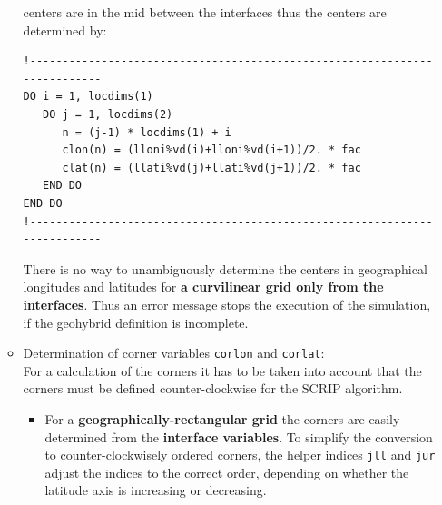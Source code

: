 \documentclass[11pt,twoside]{article}
\begin{document}
\begin{enumerate}
\begin{itemize}
centers are in the mid between the interfaces thus the centers are
determined by:
\begin{verbatim}
!--------------------------------------------------------------------------
DO i = 1, locdims(1)
   DO j = 1, locdims(2)
      n = (j-1) * locdims(1) + i
      clon(n) = (lloni%vd(i)+lloni%vd(i+1))/2. * fac 
      clat(n) = (llati%vd(j)+llati%vd(j+1))/2. * fac
   END DO
END DO
!--------------------------------------------------------------------------
\end{verbatim}
There is no way to unambiguously determine the centers in geographical
longitudes and 
latitudes for {\bf a curvilinear grid only from the interfaces}. Thus an
error message stops the execution of the simulation, if the geohybrid
 definition is incomplete.

\item Determination of corner variables \verb|corlon| and \verb|corlat|:\\
For a calculation of the corners it has to be
 taken  into account that the corners must be defined
 counter-clockwise for the SCRIP algorithm.

\begin{itemize}
\item For a {\bf geographically-rectangular grid} the corners are easily 
determined from the {\bf interface variables}. To simplify the
conversion to counter-clockwisely ordered corners, the helper
indices \verb|jll| and \verb|jur| adjust the indices to the correct
order, depending on whether the latitude axis is increasing or decreasing.


\end{itemize}
\end{itemize}
\end{enumerate}
\end{document}
